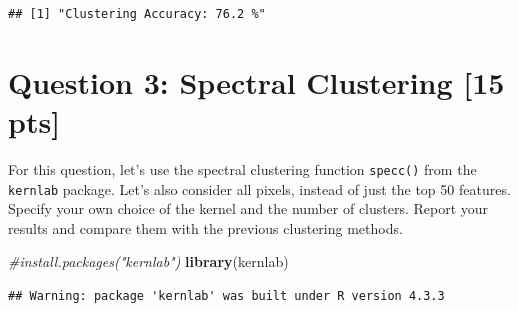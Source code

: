 \documentclass[
]{article}
\newenvironment{Shaded}{\begin{snugshade}}{\end{snugshade}}
\newcommand{\CommentTok}[1]{\textcolor[rgb]{0.56,0.35,0.01}{\textit{#1}}}
\newcommand{\FunctionTok}[1]{\textcolor[rgb]{0.13,0.29,0.53}{\textbf{#1}}}
\newcommand{\NormalTok}[1]{#1}
\begin{document}
\begin{verbatim}
## [1] "Clustering Accuracy: 76.2 %"
\end{verbatim}

\bigskip

\hypertarget{question-3-spectral-clustering-15-pts}{%
\section{Question 3: Spectral Clustering {[}15
pts{]}}\label{question-3-spectral-clustering-15-pts}}

For this question, let's use the spectral clustering function
\texttt{specc()} from the \texttt{kernlab} package. Let's also consider
all pixels, instead of just the top 50 features. Specify your own choice
of the kernel and the number of clusters. Report your results and
compare them with the previous clustering methods.

\begin{Shaded}
\begin{Highlighting}[]
\CommentTok{\#install.packages("kernlab")}
\FunctionTok{library}\NormalTok{(kernlab)}
\end{Highlighting}
\end{Shaded}

\begin{verbatim}
## Warning: package 'kernlab' was built under R version 4.3.3
\end{verbatim}
\end{document}
